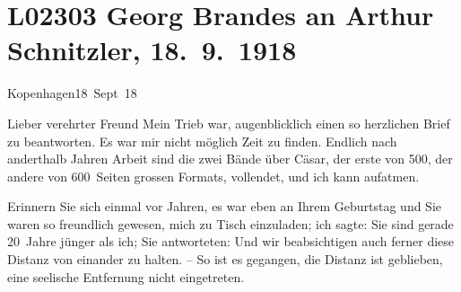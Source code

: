 

\section[Georg Brandes an Arthur Schnitzler, 18. 9. 1918]{L02303 Georg Brandes an Arthur Schnitzler, 18. 9. 1918}
\nopagebreak{}
\rehead{ }\normalsize\beginnumbering{}
\toendnotes[C]{\smallbreak\pagebreak[2]}
\toendnotes[C]{\smallbreak}
\pstart
           \raggedleft{}{\pb}Kopenhagen18 Sept 18\pend
           
\pstart{}Lieber verehrter Freund\pend\vspace{0.5em}
\pstart
           Mein Trieb war, augenblicklich einen so herzlichen Brief zu beantworten. Es war mir
               nicht möglich Zeit zu finden. Endlich nach anderthalb Jahren Arbeit sind die zwei Bände über Cäsar, der erste von 500, der andere von 600 Seiten grossen Formats, vollendet, und
               ich kann aufatmen.\pend
           
\pstart
           Erinnern Sie sich einmal vor Jahren, es war eben an Ihrem Geburtstag und Sie waren so
               freundlich gewesen, mich zu Tisch einzuladen; ich sagte: Sie sind gerade 20 Jahre
               jünger als ich; Sie antworteten: Und wir beabsichtigen auch ferner diese Distanz von
               einander zu halten. – So ist es gegangen, die Distanz ist geblieben, eine seelische
               Entfernung nicht eingetreten.\pend
           
